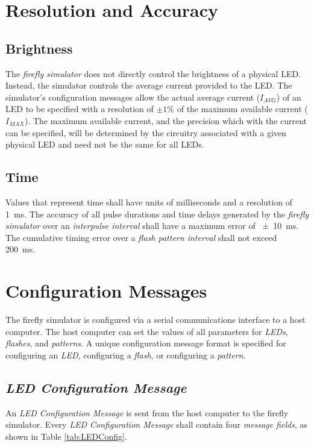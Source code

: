\documentclass[letterpaper,11pt]{article}
\begin{document}
\section{Resolution and Accuracy}

\subsection{Brightness}

The \textit{firefly simulator} does not directly control the brightness of a
physical LED. Instead, the simulator controls the average current provided to
the LED. The simulator's configuration messages allow the actual average
current ($I_{AVG}$) of an LED to be specified with a resolution of $\pm 1$\% of
the maximum available current ($I_{MAX}$). The maximum available current, and
the precision which with the current can be specified, will be
determined by the circuitry associated with a given physical LED and need not be
the same for all LEDs.

\subsection{Time}

Values that represent time shall have units of milliseconds and a resolution
of \SI{1}{\milli\second}. The accuracy of all pulse durations and time delays
generated by the \textit{firefly simulator} over an \textit{interpulse interval}
shall have a maximum error of \SI{\pm 10}{\milli\second}. The cumulative timing
error over a \textit{flash pattern interval} shall not exceed
\SI{200}{\milli\second}.

\section{Configuration Messages}

The firefly simulator is configured via a serial communications interface to
a host computer. The host computer can set the values of all parameters for
\textit{LEDs}, \textit{flashes}, and \textit{patterns}. A unique configuration
message format is specified for configuring an \textit{LED}, configuring a
\textit{flash}, or configuring a \textit{pattern}.

\subsection{\textit{LED Configuration Message}}

An \textit{LED Configuration Message} is sent from the host computer to the
firefly simulator. Every \textit{LED Configuration Message} shall contain
four \textit{message fields}, as shown in Table \ref{tab:LEDConfig}.
\end{document}
